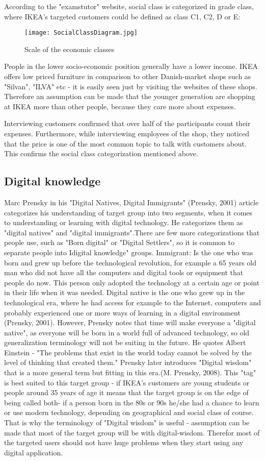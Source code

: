 According to the "examstutor" website, social class is categorized in grade class, where IKEA's targeted customers could be defined as class C1, C2, D or E:
\begin{figure}[H]
\centering
\texttt{[image: SocialClassDiagram.jpg]}
\caption{Scale of the economic classes}
\end{figure}
People in the lower socio-economic position generally have a lower income. IKEA offers low priced furniture in comparison to other Danish-market shops such as "Silvan", "ILVA" etc - it is easily seen just by visiting the websites of these shops. Therefore an assumption can be made that the younger generation are shopping at IKEA more than other people, because they care more about expenses.  

Interviewing customers confirmed that over half of the participants count their expenses. Furthermore, while interviewing employees of the shop, they noticed that the price is one of the most common topic to talk with customers about. This confirms the social class categorization mentioned above. 

\subsection{Digital knowledge}
Marc Prensky in his "Digital Natives, Digital Immigrants" (Prensky, 2001) article categorizes his understanding of target group into two segments, when it comes to understanding or learning with digital technology. He categorizes them as "digital natives" and "digital immigrants".There are few more categorizations that people use, such as "Born digital" or "Digital Settlers", so it is common to separate people into Idigital knowledge" groups.  Immigrant: Is the one who was born and grew up before the technological revolution, for example a 65 years old man who did not have all the computers and digital tools or equipment that people do now. This person only adopted the technology at a certain age or point in their life when it was needed. Digital native is the one who grew up in the technological era, where he had access for example to the Internet, computers and probably experienced one or more ways of learning in a digital environment (Prensky, 2001). However, Prensky notes that time will make everyone a "digital native", as everyone will be born in a world full of advanced technology, so old generalization terminology will not be suiting in the future. He quotes Albert Einstein - "The problems that exist in the world today cannot be solved by the level of thinking that created them." Prensky later introduces "Digital wisdom" that is a more general term but fitting in this era.(M. Prensky, 2008). This "tag" is best suited to this target group - if IKEA's customers are young students or people around 35 years of age it means that the target group is on the edge of being called both- if a person born in the 80s or 90s he/she had a chance to learn or use modern technology, depending on geographical and social class of course. That is why the terminology of "Digital wisdom" is useful - assumption can be made that most of the target group will be with digital-wisdom. Therefor most of the targeted users should not have huge problems when they start using any digital application.

